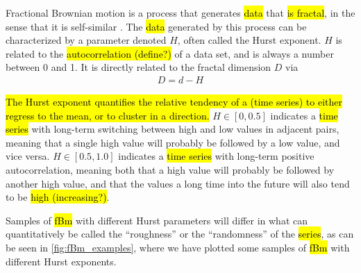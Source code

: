 Fractional Brownian motion is a process that generates \hl{data} that \hl{is fractal}, in the sense that it is self-similar%
. The \hl{data} generated by this process can be characterized by a parameter denoted $H$, often called the Hurst exponent. $H$ is related to the \hl{autocorrelation (define?)} of a data set, and is always a number between 0 and 1. It is directly related to the fractal dimension $D$ via\cite{feder1988fractals}
\begin{align*}
    D = d - H
\end{align*}

\hl{The Hurst exponent quantifies the relative tendency of a (time series) to either regress to the mean, or to cluster in a direction.} $H\in[0,0.5]$ indicates a \hl{time series} with long-term switching between high and low values in adjacent pairs, meaning that a single high value will probably be followed by a low value, and vice versa. $H\in[0.5,1.0]$ indicates a \hl{time series} with long-term positive autocorrelation, meaning both that a high value will probably be followed by another high value, and that the values a long time into the future will also tend to be \hl{high (increasing?)}.

Samples of \hl{fBm} with different Hurst parameters will differ in what can quantitatively be called the ``roughness'' or the ``randomness'' of the \hl{series}, as can be seen in \cref{fig:fBm_examples}, where we have plotted some samples of \hl{fBm} with different Hurst exponents.



